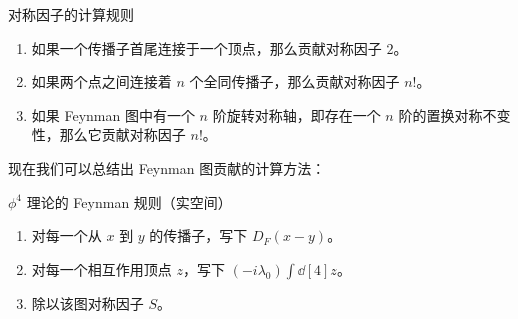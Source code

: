 \begin{theorem}{对称因子的计算规则}\label{the_wick_1}
\begin{enumerate}
\item 如果一个传播子首尾连接于一个顶点，那么贡献对称因子 $2$。
\item 如果两个点之间连接着 $n$ 个全同传播子，那么贡献对称因子 $n!$。
\item 如果 Feynman 图中有一个 $n$ 阶旋转对称轴，即存在一个 $n$ 阶的置换对称不变性，那么它贡献对称因子 $n!$。
\end{enumerate}
\end{theorem}
现在我们可以总结出 Feynman 图贡献的计算方法：
\begin{theorem}{$\phi^4$ 理论的 Feynman 规则（实空间）}
\begin{enumerate}
\item 对每一个从 $x$ 到 $y$ 的传播子，写下 $D_F(x-y)$。
\item 对每一个相互作用顶点 $z$，写下 $(-i\lambda_0)\int \dd[4]z$。
\item 除以该图对称因子 $S$。
\end{enumerate}
\end{theorem}
